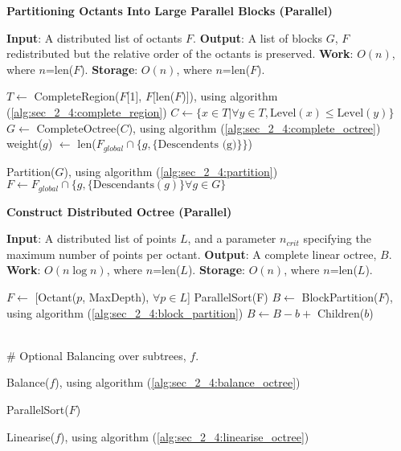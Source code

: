 \begin{algorithm}
    \caption{\textbf{Partitioning Octants Into Large Parallel Blocks (Parallel)}}
    \label{alg:sec_2_4:block_partition}
    \begin{algorithmic}
        \STATE \textbf{Input}: A distributed list of octants $F$.
        \STATE \textbf{Output}: A list of blocks $G$, $F$ redistributed but the relative order of the octants is preserved. 
        \STATE \textbf{Work}: $O(n)$, where $n$=len($F$).
        \STATE \textbf{Storage}: $O(n)$, where $n$=len($F$).

        \STATE $T \gets $ CompleteRegion($F$[1], $F$[len($F$)]), using algorithm (\ref{alg:sec_2_4:complete_region})
        \STATE $C \gets \{ x \in T | \forall y \in T, \text{Level}(x) \leq \text{Level}(y) \}$
        \STATE $G \gets $ CompleteOctree($C$), using algorithm (\ref{alg:sec_2_4:complete_octree})
            weight($g$) $\gets $ len($F_{global} \cap \{ g,  \{ \text{Descendents (g)} \} \}$)
        \ENDFOR

        \STATE Partition($G$), using algorithm (\ref{alg:sec_2_4:partition})
        \STATE $F \gets F_{global} \cap \{ g, \{ \text{Descendants}(g) \} \forall g \in G \}$
    \end{algorithmic}
\end{algorithm}

\begin{algorithm}
    \caption{\textbf{Construct Distributed Octree (Parallel)}}
    \label{alg:sec_2_4:point2octree}
    \begin{algorithmic}
        \STATE \textbf{Input}: A distributed list of points $L$, and a parameter $n_{crit}$ specifying the maximum number of points per octant.
        \STATE \textbf{Output}: A complete linear octree, $B$. 
        \STATE \textbf{Work}: $O(n \log n)$, where $n$=len($L$).
        \STATE \textbf{Storage}: $O(n)$, where $n$=len($L$).
        
        \STATE $F \gets $ [Octant($p$, MaxDepth), $\forall p \in L$]
        \STATE ParallelSort(F)
        \STATE $B \gets $ BlockPartition($F$), using algorithm (\ref{alg:sec_2_4:block_partition})
                \STATE $B \gets B - b + $ Children($b$)
            \ENDIF
        \ENDFOR

        \STATE \\\# Optional Balancing over subtrees, $f$.

                \STATE Balance($f$), using algorithm (\ref{alg:sec_2_4:balance_octree})
            \ENDFOR

            \STATE ParallelSort($F$)
            
                \STATE Linearise($f$), using algorithm (\ref{alg:sec_2_4:linearise_octree})
            \ENDFOR
        \ENDIF

    \end{algorithmic}
\end{algorithm}

